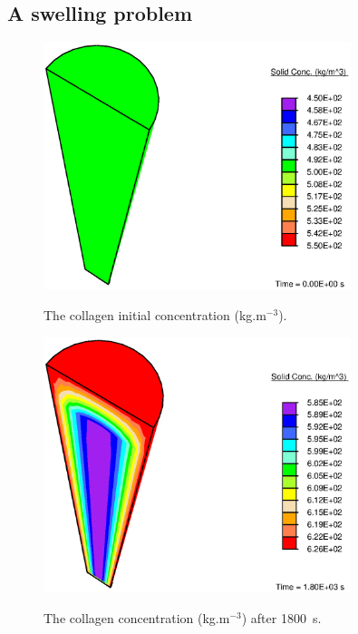 
\subsection{A swelling problem}
\label{swelling-1}

\begin{figure}[!hpt]
  \centering
     {\includegraphics[width=0.8\textwidth]{images/examples/lagrangian/swelling/before-growth}}
     \caption{The collagen initial concentration (kg.m$^{-3}$).}
     \label{before_growth}
\end{figure}

\begin{figure}[!hpt]
  \centering
     {\includegraphics[width=0.8\textwidth]{images/examples/lagrangian/swelling/after-growth}}
     \caption{The collagen concentration (kg.m$^{-3}$) after 1800~s.}
     \label{after_growth}
\end{figure}

